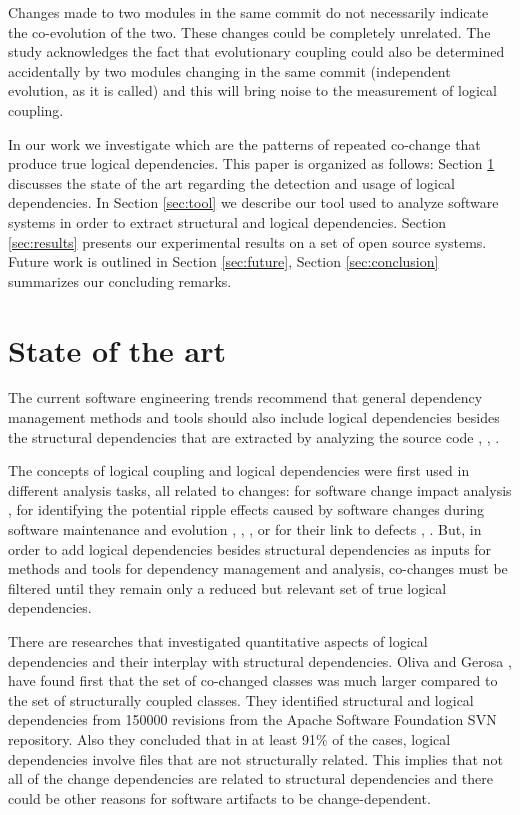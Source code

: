 \documentclass[conference]{IEEEtran}
\begin{document}
Changes made to two modules in the same commit do not necessarily indicate the co-evolution of the two. These changes could be completely unrelated. The study \cite{Yu2007} acknowledges the fact that evolutionary coupling could also be determined accidentally by two modules changing in the same commit (independent evolution, as it is called) and this will bring noise to the measurement of logical coupling. 

In our work we investigate which are the patterns of repeated co-change that produce true logical dependencies. This paper is organized as follows: Section \ref{sec:state} discusses the state of the art regarding the detection and usage of logical dependencies. In Section \ref{sec:tool} we describe our tool used to analyze software systems in order to extract structural and logical dependencies. Section \ref{sec:results} presents our experimental results on a set of open source systems. Future work is outlined in Section \ref{sec:future}, Section \ref{sec:conclusion} summarizes our concluding remarks.



\section{State of the art}
\label{sec:state}
The current software engineering trends recommend that general dependency management methods and tools should also include logical dependencies besides the structural dependencies that are extracted by analyzing the source code \cite{Oliva:2011:ISL:2067853.2068086}, \cite{DBLP:journals/jss/AjienkaC17}, \cite{Yu2007}. 

The concepts of logical coupling and logical dependencies were first used in different analysis tasks, all related to changes: for software change impact analysis \cite{1553643}, for identifying the potential ripple effects caused by software changes during software maintenance and evolution \cite{DBLP:conf/issre/OlivaG15}, \cite{Oliva:2011:ISL:2067853.2068086}, \cite{Poshyvanyk2009}, \cite{posh2010} or for their link to defects \cite{wiese}, \cite{Zimmermann:2004:MVH:998675.999460}. But, in order to add logical dependencies besides structural dependencies as inputs for methods and tools for dependency management and analysis, co-changes must be filtered until they remain only a reduced but relevant set of true logical dependencies. 

There are researches that investigated quantitative aspects of logical dependencies and their interplay with structural dependencies. 
Oliva and Gerosa \cite{Oliva:2011:ISL:2067853.2068086}, \cite{DBLP:conf/issre/OlivaG15} have found first that the set of co-changed classes was much larger compared to the set of structurally coupled classes. They identified structural and logical dependencies from 150000 revisions from the Apache Software Foundation SVN repository. Also they concluded  that in at least 91\% of the cases, logical dependencies involve files that are not structurally related. This implies that not all of the change dependencies are related to structural dependencies and there could be other reasons for software artifacts to be change-dependent.
\end{document}
